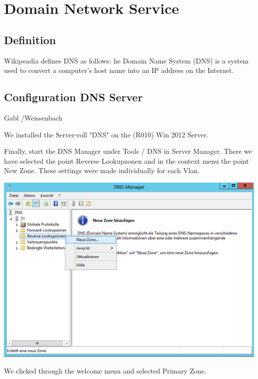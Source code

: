 \newpage


\section{Domain Network Service}

\subsection{Definition}

Wikipeadia defines DNS as follows:
he Domain Name System (DNS) is a system used to convert a computer's host name into an IP address on the Internet.



\subsection{Configuration DNS Server}



Gabl /Weissenbach\newline

We installed the Server-roll "DNS" on the (R010) Win 2012 Server.

Finally, start the DNS Manager under Tools / DNS in Server Manager.
There we have selected the point Reverse Lookupzonen and in the context menu the point New Zone. These settings were made individually for each Vlan.\newline


\begin{minipage}[X]{0.8\textwidth} 
	\centering 
		\includegraphics [scale=0.5]{graphics/1.png}
	\label{ecoconcept} 
\end{minipage} 
\newline\newline
We clicked through the welcome menu and selected Primary Zone.
\newline


